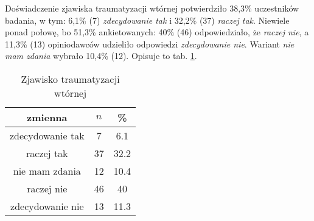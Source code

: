 Doświadczenie zjawiska traumatyzacji wtórnej potwierdziło 38,3\% uczestników badania, w tym: 6,1\% (7) \textit{zdecydowanie tak} i 32,2\% (37) \textit{raczej tak}. Niewiele ponad połowę, bo  51,3\% ankietowanych: 40\% (46) odpowiedziało, że \textit{raczej nie}, a  11,3\% (13) opiniodawców udzieliło odpowiedzi \textit{zdecydowanie nie}. Wariant \textit{nie mam zdania} wybrało 10,4\% (12). Opisuje to tab. \ref{tab:Q11}.


\begin{table}[H]
\caption{Zjawisko traumatyzacji wtórnej}
\centering
\begin{tabular}{ | c | c | c |}
\hline
zmienna & $n$ & \% \\
\hline
zdecydowanie tak  &  7  & 6.1 \\
\hline
raczej tak  &  37  & 32.2\\
\hline
nie mam zdania  &  12  & 10.4\\
\hline
raczej nie  &  46  & 40 \\
\hline
zdecydowanie nie  &  13  & 11.3\\
\hline
\end{tabular}
\label{tab:Q11}
\end{table}